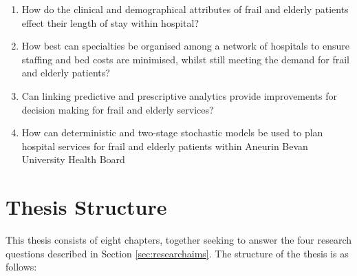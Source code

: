 \documentclass[../thesis.tex]{subfiles}
\begin{document}
\begin{enumerate}
    \item How do the clinical and demographical attributes of frail and elderly patients effect their length of stay within hospital? 
   
    \item How best can specialties be organised among a network of hospitals to ensure staffing and bed costs are minimised, whilst still meeting the demand for frail and elderly patients?
    
    \item Can linking predictive and prescriptive analytics provide improvements for decision making for frail and elderly services? 
    
    \item How can deterministic and two-stage stochastic models be used to plan hospital services for frail and elderly patients within Aneurin Bevan University Health Board

\end{enumerate}

\section{Thesis Structure}
This thesis consists of eight chapters, together seeking to answer the four research questions described in Section \ref{sec:researchaims}. The structure of the thesis is as follows:
\end{document}
